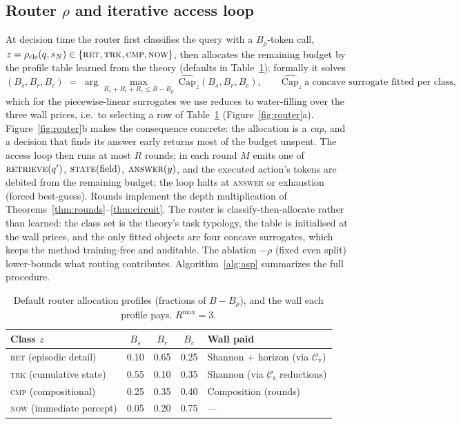 \documentclass[10pt]{article}
\theoremstyle{definition}
\theoremstyle{plain}
\renewcommand{\Cap}{\mathrm{Cap}}
\newcommand{\cs}{\mathcal{C}_{\mathrm{s}}}
\newcommand{\cv}{\mathcal{C}_{\mathrm{v}}}
\begin{document}
\subsection{Router $\rho$ and iterative access loop}
\label{sec:router}
At decision time the router first classifies the query with a $B_\rho$-token call, $z=\rho_{\mathrm{cls}}(q,s_N)\in\{\textsc{ret},\allowbreak\textsc{trk},\allowbreak\textsc{cmp},\allowbreak\textsc{now}\}$, then allocates the remaining budget by the profile table learned from the theory (defaults in Table~\ref{tab:alloc}); formally it solves
\[
(B_s,B_r,B_c)\;=\;\arg\max_{B_s+B_r+B_c\le B-B_\rho}\ \widehat{\Cap}_z(B_s,B_r,B_c),
\qquad
\widehat{\Cap}_z\ \text{a concave surrogate fitted per class,}
\]
which for the piecewise-linear surrogates we use reduces to water-filling over the three wall prices, i.e.\ to selecting a row of Table~\ref{tab:alloc} (Figure~\ref{fig:router}a). Figure~\ref{fig:router}b makes the consequence concrete: the allocation is a \emph{cap}, and a decision that finds its answer early returns most of the budget unspent. The access loop then runs at most $R$ rounds; in each round $M$ emits one of
$\textsc{retrieve}(q')$, $\textsc{state}(\mathrm{field})$, $\textsc{answer}(y)$,
and the executed action's tokens are debited from the remaining budget; the loop halts at \textsc{answer} or exhaustion (forced best-guess). Rounds implement the depth multiplication of Theorems~\ref{thm:rounds}--\ref{thm:circuit}. The router is classify-then-allocate rather than learned: the class set is the theory's task typology, the table is initialised at the wall prices, and the only fitted objects are four concave surrogates, which keeps the method training-free and auditable. The ablation $-\rho$ (fixed even split) lower-bounds what routing contributes. Algorithm~\ref{alg:asp} summarizes the full procedure.


\begin{table}[!t]
\centering\small
\caption{Default router allocation profiles (fractions of $B-B_\rho$), and the wall each profile pays. $R^{\max}=3$.}
\label{tab:alloc}
\begin{tabular}{lcccl}
\toprule
Class $z$ & $B_s$ & $B_r$ & $B_c$ & Wall paid \\
\midrule
\textsc{ret} (episodic detail) & 0.10 & 0.65 & 0.25 & Shannon $+$ horizon (via $\cv$) \\
\textsc{trk} (cumulative state) & 0.55 & 0.10 & 0.35 & Shannon (via $\cs$ reductions) \\
\textsc{cmp} (compositional) & 0.25 & 0.35 & 0.40 & Composition (rounds) \\
\textsc{now} (immediate percept) & 0.05 & 0.20 & 0.75 & --- \\
\bottomrule
\end{tabular}
\end{table}
\end{document}
